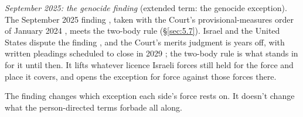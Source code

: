 \emph{September 2025: the genocide finding} (extended term: the genocide exception). The September 2025 finding \autocite{coiopt2025genocide}, taken with the Court's provisional-measures order of January 2024 \autocite{icj2024sagenocidepm}, meets the two-body rule (\S\ref{sec:5.7}). Israel and the United States dispute the finding \autocite{cnn2025coi}, and the Court's merits judgment is years off, with written pleadings scheduled to close in 2029 \autocite{icj2026sagenocide}; the two-body rule is what stands in for it until then. It lifts whatever licence Israeli forces still held for the force and place it covers, and opens the exception for force against those forces there.

The finding changes which exception each side's force rests on. It doesn't change what the person-directed terms forbade all along.

